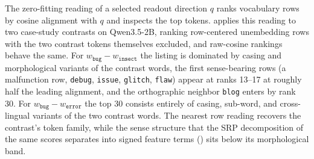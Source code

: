 The zero-fitting reading of a selected readout direction \(q\) ranks
vocabulary rows by cosine alignment with \(q\) and inspects the top
tokens.  applies this reading to two
case-study contrasts on Qwen3.5-2B, ranking row-centered unembedding rows
with the two contrast tokens themselves excluded, and raw-cosine rankings
behave the same. For \(w_{\texttt{bug}}-w_{\texttt{insect}}\) the listing
is dominated by casing and morphological variants of the contrast words,
the first sense-bearing rows (a malfunction row, \texttt{debug},
\texttt{issue}, \texttt{glitch}, \texttt{flaw}) appear at ranks 13--17 at
roughly half the leading alignment, and the orthographic neighbor
\texttt{blog} enters by rank 30. For
\(w_{\texttt{bug}}-w_{\texttt{error}}\) the top 30 consists entirely of
casing, sub-word, and cross-lingual variants of the two contrast words.
The nearest row reading recovers the contrast's token family, while the
sense structure that the SRP decomposition of the same scores separates
into signed feature terms
() sits below its morphological
band.

